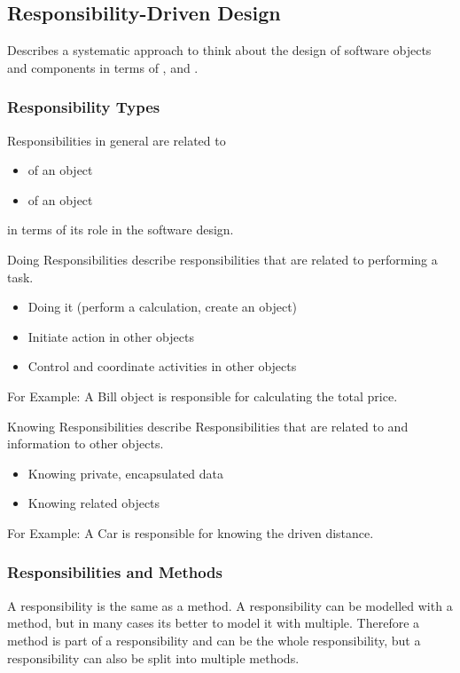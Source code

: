 \documentclass[
../../Software_Engineering_Summary.tex,
]
{subfiles}
\begin{document}
\subsection{Responsibility-Driven Design}
\begin{defbox*}
    Describes a systematic approach to think about the design of software objects and components in terms of ,  and .
\end{defbox*}

\subsubsection{Responsibility Types}
Responsibilities in general are related to
\begin{itemize}
    \item {} of an object
    \item {} of an object
\end{itemize}
in terms of its role in the software design.

\begin{defbox}
    Doing Responsibilities describe responsibilities that are related to performing a task.
    \begin{itemize}
        \item Doing it (perform a calculation, create an object)
        \item Initiate action in other objects
        \item Control and coordinate activities in other objects
    \end{itemize}
    For Example: A Bill object is responsible for calculating the total price.
\end{defbox}

\begin{defbox}
    Knowing Responsibilities describe Responsibilities that are related to  and  information to other objects.
    \begin{itemize}
        \item Knowing private, encapsulated data
        \item Knowing related objects
    \end{itemize}
    For Example: A Car is responsible for knowing the driven distance.
\end{defbox}

\subsubsection{Responsibilities and Methods}
A responsibility is  the same as a method. A responsibility can be modelled with a method, but in many cases its better to model it with multiple. Therefore a method is part of a responsibility and can be the whole responsibility, but a responsibility can also be split into multiple methods.
\end{document}
